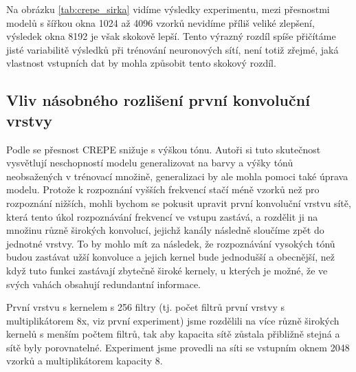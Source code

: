 Na obrázku \ref{tab:crepe_sirka} vidíme výsledky experimentu, mezi přesnostmi modelů s šířkou okna 1024 až 4096 vzorků nevidíme příliš veliké zlepšení, výsledek okna 8192 je však skokově lepší. Tento výrazný rozdíl spíše přičítáme jisté variabilitě výsledků při trénování neuronových sítí, není totiž zřejmé, jaká vlastnost vstupních dat by mohla způsobit tento skokový rozdíl.



\subsection{Vliv násobného rozlišení první konvoluční vrstvy}\label{exp:crepe_multirozliseni}

Podle \cite{Kim2018} se přesnost CREPE snižuje s výškou tónu. Autoři si tuto skutečnost vysvětlují neschopností modelu generalizovat na barvy a výšky tónů neobsažených v trénovací množině, generalizaci by ale mohla pomoci také úprava modelu. Protože k rozpoznání vyšších frekvencí stačí méně vzorků než pro rozpoznání nižších, mohli bychom se pokusit upravit první konvoluční vrstvu sítě, která tento úkol rozpoznávání frekvencí ve vstupu zastává, a rozdělit ji na množinu různě širokých konvolucí, jejichž kanály následně sloučíme zpět do jednotné vrstvy. To by mohlo mít za následek, že rozpoznávání vysokých tónů budou zastávat užší konvoluce a jejich kernel bude jednodušší a obecnější, než když tuto funkci zastávají zbytečně široké kernely, u kterých je možné, že ve svých vahách obsahují redundantní informace.

První vrstvu s kernelem s 256 filtry (tj. počet filtrů první vrstvy s multiplikátorem 8x, viz první experiment) jsme rozdělili na více různě širokých kernelů s menším počtem filtrů, tak aby kapacita sítě zůstala přibližně stejná a sítě byly porovnatelné. Experiment jsme provedli na síti se vstupním oknem 2048 vzorků a multiplikátorem kapacity 8.

